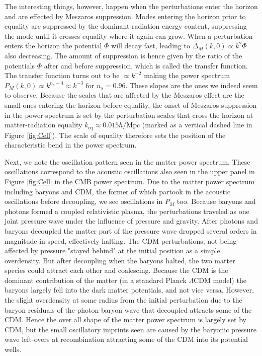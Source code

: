 \documentclass[twocolumn]{aastex62}
\begin{document}
The interesting things, however, happen when the perturbations enter the horizon and are effected by Meszaros suppression. Modes entering the horizon prior to equality are suppressed by the dominant radiation energy content, suppressing the mode until it crosses equality where it again can grow. When a perturbation enters the horizon the potential $\Phi$ will decay fast, leading to $\Delta_M(k, 0)\propto k^2\Phi$ also decreasing. The amount of suppression is hence given by the ratio of the potentials $\Phi$ after and before suppression, which is called the transfer function. The transfer function turns out to be $\propto k^{-2}$ \citep[p. 203]{dodelson:2003} making the power spectrum $P_M(k, 0)\propto k^{n_s-4} \approx k^{-3}$ for $n_s = 0.96$. These slopes are the ones we indeed seem to observe. Because the scales that are affected by the Meszaros effect are the small ones entering the horizon before equality, the onset of Meszaros suppression in the power spectrum is set by the perturbation scales that cross the horizon at matter-radiation equality $k_\text{eq} \approx 0.015 h/\mathrm{Mpc}$ (marked as a vertical dashed line in Figure \ref{fig:Cell}). The scale of equality therefore sets the position of the characteristic bend in the power spectrum.  

Next, we note the oscillation pattern seen in the matter power spectrum. These oscillations correspond to the acoustic oscillations also seen in the upper panel in Figure \ref{fig:Cell} in the CMB power spectrum. Due to the matter power spectrum including baryons and CDM, the former of which partook in the acoustic oscillations before decoupling, we see oscillations in $P_M$ too. Because baryons and photons formed a coupled relativistic plasma, the perturbations traveled as one joint pressure wave under the influence of pressure and gravity. After photons and baryons decoupled the matter part of the pressure wave dropped several orders in magnitude in speed, effectively halting. The CDM perturbations, not being affected by pressure "stayed behind" at the initial position as a simple overdensity. But after decoupling when the baryons halted, the two matter species could attract each other and coalescing. Because the CDM is the dominant contribution of the matter (in a standard Planck $\Lambda$CDM model) the baryons largely fell into the dark matter potentials, and not vice versa. However, the slight overdensity at some radius from the initial perturbation due to the baryon residuals of the photon-baryon wave that decoupled attracts some of the CDM. Hence the over all shape of the matter power spectrum is largely set by CDM, but the small oscillatory imprints seen are caused by the baryonic pressure wave left-overs at recombination attracting some of the CDM into its potential wells.
\end{document}
